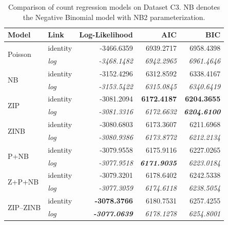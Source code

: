 \begin{table}[!h]
\caption{Comparison of count regression models on Dataset C3. NB denotes the Negative Binomial model with NB2 parameterization.}
\centering
\begin{tabular}{llrrr}
\toprule
Model & Link & Log-Likelihood & AIC & BIC \\
\midrule
\multirow[t]{2}{*}{Poisson} & identity & -3466.6359 & 6939.2717 & 6958.4398 \\
 & \textit{log} & \textit{-3468.1482} & \textit{6942.2965} & \textit{6961.4646} \\

\multirow[t]{2}{*}{NB} & identity & -3152.4296 & 6312.8592 & 6338.4167 \\
 & \textit{log} & \textit{-3153.5422} & \textit{6315.0845} & \textit{6340.6419} \\

\multirow[t]{2}{*}{ZIP} & identity & -3081.2094 & \textbf{6172.4187} & \textbf{6204.3655} \\
 & \textit{log} & \textit{-3081.3316} & \textit{6172.6632} & \textbf{\textit{6204.6100}} \\

\multirow[t]{2}{*}{ZINB} & identity & -3080.6803 & 6173.3607 & 6211.6968 \\
 & \textit{log} & \textit{-3080.9386} & \textit{6173.8772} & \textit{6212.2134} \\

\multirow[t]{2}{*}{P+NB} & identity & -3079.9558 & 6175.9116 & 6227.0265 \\
 & \textit{log} & \textit{-3077.9518} & \textbf{\textit{6171.9035}} & \textit{6223.0184} \\

\multirow[t]{2}{*}{Z+P+NB} & identity & -3079.3201 & 6178.6402 & 6242.5338 \\
 & \textit{log} & \textit{-3077.3059} & \textit{6174.6118} & \textit{6238.5054} \\

\multirow[t]{2}{*}{ZIP--ZINB} & identity & \textbf{-3078.3766} & 6180.7531 & 6257.4255 \\
 & \textit{log} & \textbf{\textit{-3077.0639}} & \textit{6178.1278} & \textit{6254.8001} \\

\bottomrule
\end{tabular}
\label{tab:C3}
\end{table}
